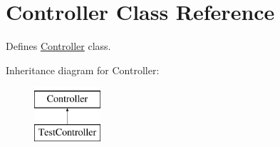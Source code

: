 \hypertarget{class_controller}{
\section{Controller Class Reference}
\label{class_controller}
}


Defines \hyperlink{class_controller}{Controller} class.  


Inheritance diagram for Controller:\begin{figure}[H]
\begin{center}
\leavevmode
\includegraphics[height=2.000000cm]{class_controller}
\end{center}
\end{figure}
